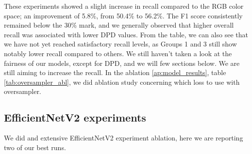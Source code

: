 \begin{table}[H]
\centering
\caption{Comparison of selected ConvNeXt Tiny experiments on CIELAB images.}
\label{tab:selected-experiments}
\end{table}

These experiments showed a slight increase in recall compared to the RGB color space; an improvement of 5.8\%, from 50.4\% to 56.2\%.  
The F1 score consistently remained below the 30\% mark, and we generally observed that higher overall recall was associated with lower DPD values.  
From the table, we can also see that we have not yet reached satisfactory recall levels, as Groups 1 and 3 still show notably lower recall compared to others.
We still haven't taken a look at the fairness of our models, except for DPD, and we will few sections below. We are still aiming to increase the recall.
In the ablation \ref{ap:model_results}, table \ref{tab:oversampler_abl}, we did ablation study concerning which loss to use with oversampler.

\subsection{EfficientNetV2 experiments}
We did and extensive EfficientNetV2 experiment ablation, here we are reporting two of our best runs.

